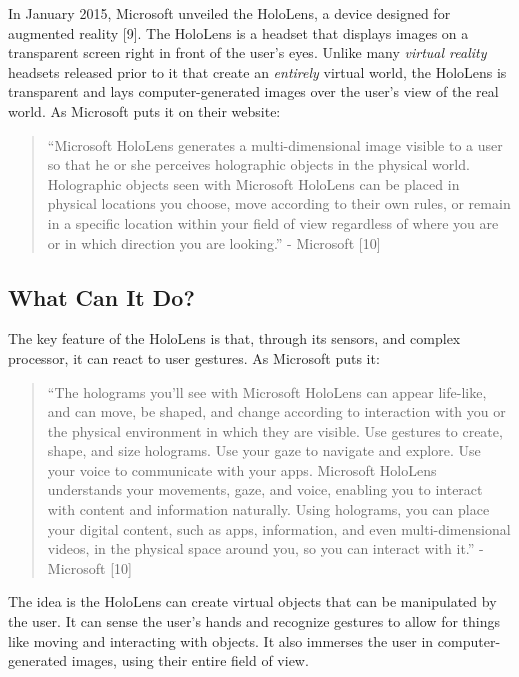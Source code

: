 \documentclass[a4paper,12pt]{article}
\begin{document}
In January 2015, Microsoft unveiled the HoloLens, a device designed for augmented reality [9]. The HoloLens is a headset that displays images on a transparent screen right in front of the user's eyes. Unlike many \emph{virtual reality} headsets released prior to it that create an \emph{entirely} virtual world, the HoloLens is transparent and lays computer-generated images over the user's view of the real world. As Microsoft puts it on their website: 

\begin{quote}
``Microsoft HoloLens generates a multi-dimensional image visible to a user so that he or she perceives holographic objects in the physical world. Holographic objects seen with Microsoft HoloLens can be placed in physical locations you choose, move according to their own rules, or remain in a specific location within your field of view regardless of where you are or in which direction you are looking.'' - Microsoft [10]
\end{quote}

\subsection{What Can It Do?}

The key feature of the HoloLens is that, through its sensors, and complex processor, it can react to user gestures. As Microsoft puts it: 

\begin{quote} 
    ``The holograms you'll see with Microsoft HoloLens can appear life-like, and can move, be shaped, and change according to interaction with you or the physical environment in which they are visible. Use gestures to create, shape, and size holograms. Use your gaze to navigate and explore. Use your voice to communicate with your apps. Microsoft HoloLens understands your movements, gaze, and voice, enabling you to interact with content and information naturally. Using holograms, you can place your digital content, such as apps, information, and even multi-dimensional videos, in the physical space around you, so you can interact with it.'' - Microsoft [10]
\end{quote}

The idea is the HoloLens can create virtual objects that can be manipulated by the user. It can sense the user's hands and recognize gestures to allow for things like moving and interacting with objects. It also immerses the user in computer-generated images, using their entire field of view. 
\end{document}
